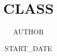 \documentclass{report}
\title{CLASS}
\author{AUTHOR}
\date{START_DATE}
\begin{document}
  \createintro

  \newpage

\end{document}
